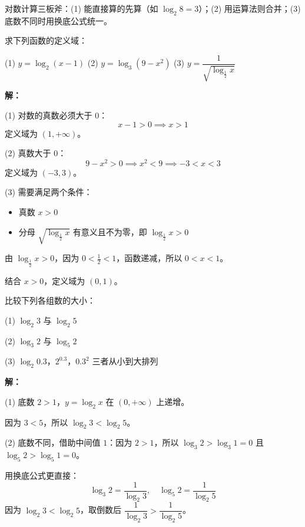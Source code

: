 \documentclass[12pt, a4paper]{ctexart}
\begin{document}
\begin{tipbox}[方法总结]
对数计算三板斧：(1) 能直接算的先算（如 $\log_2 8=3$）；(2) 用运算法则合并；(3) 底数不同时用换底公式统一。
\end{tipbox}

\begin{examplebox}[【例6】对数函数的定义域与值域]
求下列函数的定义域：
\par (1) $y = \log_2(x-1)$ \qquad (2) $y = \log_3(9-x^2)$ \qquad (3) $y = \dfrac{1}{\sqrt{\log_{\frac{1}{2}} x}}$
\end{examplebox}

\textbf{解：}

(1) 对数的真数必须大于 $0$：
\[
x - 1 > 0 \implies x > 1
\]
定义域为 $(1, +\infty)$。

(2) 真数大于 $0$：
\[
9 - x^2 > 0 \implies x^2 < 9 \implies -3 < x < 3
\]
定义域为 $(-3, 3)$。

(3) 需要满足两个条件：
\begin{itemize}[leftmargin=2em]
  \item 真数 $x>0$
  \item 分母 $\sqrt{\log_{\frac{1}{2}} x}$ 有意义且不为零，即 $\log_{\frac{1}{2}} x > 0$
\end{itemize}

由 $\log_{\frac{1}{2}} x > 0$，因为 $0<\frac{1}{2}<1$，函数递减，所以 $0 < x < 1$。

结合 $x>0$，定义域为 $(0, 1)$。

\begin{examplebox}[【例7】比较对数的大小]
比较下列各组数的大小：
\par (1) $\log_2 3$ 与 $\log_2 5$
\par (2) $\log_3 2$ 与 $\log_5 2$
\par (3) $\log_2 0.3$，$2^{0.3}$，$0.3^{2}$ 三者从小到大排列
\end{examplebox}

\textbf{解：}

(1) 底数 $2>1$，$y=\log_2 x$ 在 $(0,+\infty)$ 上递增。

因为 $3<5$，所以 $\log_2 3 < \log_2 5$。

(2) 底数不同，借助中间值 $1$：因为 $2>1$，所以 $\log_3 2 > \log_3 1 = 0$ 且 $\log_5 2 > \log_5 1 = 0$。

用换底公式更直接：
\[
\log_3 2 = \frac{1}{\log_2 3}, \quad \log_5 2 = \frac{1}{\log_2 5}
\]
因为 $\log_2 3 < \log_2 5$，取倒数后 $\dfrac{1}{\log_2 3} > \dfrac{1}{\log_2 5}$。
\end{document}
